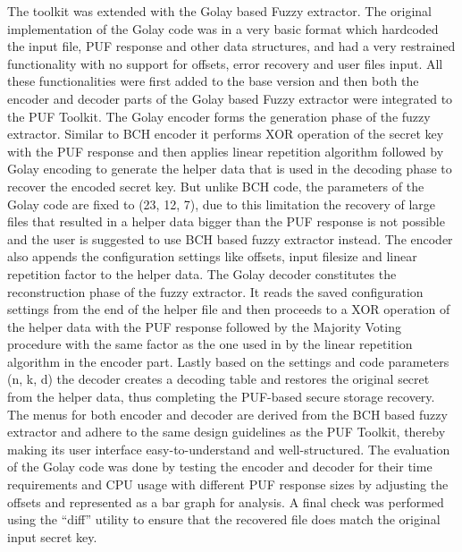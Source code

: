 The toolkit was extended with the Golay based Fuzzy extractor. The original implementation of the Golay code was in a very basic format which hardcoded the input file, PUF response and other data structures, and had a very restrained functionality with no support for offsets, error recovery and user files input. All these functionalities were first added to the base version and then both the encoder and decoder parts of the Golay based Fuzzy extractor were integrated to the PUF Toolkit. The
Golay encoder forms the generation phase of the fuzzy extractor. Similar to BCH encoder it performs XOR operation of the secret key with the PUF response and then applies linear repetition algorithm followed by Golay encoding to generate the helper data that is used in the decoding phase to recover the encoded secret key. But unlike BCH code, the parameters of the Golay code are fixed to (23, 12, 7), due to this limitation the recovery of large files that resulted in a helper data bigger than
the PUF response is not possible and the user is suggested to use BCH based fuzzy extractor instead. The encoder also appends the configuration settings like offsets, input filesize and linear repetition factor to the helper data. The Golay decoder constitutes the reconstruction phase of the fuzzy extractor. It reads the saved configuration settings from the end of the helper file and then proceeds to a XOR operation of the helper
data with the PUF response followed by the Majority Voting procedure with the same factor as the one used in by the linear repetition algorithm in the encoder part. Lastly based on the settings and code parameters (n, k, d) the decoder creates a decoding table and restores the original secret from the helper data, thus completing the PUF-based secure storage recovery. The menus for both encoder and decoder are derived from the BCH based fuzzy extractor and
adhere to the same design guidelines as the PUF Toolkit, thereby making its user interface easy-to-understand and well-structured. The evaluation of the Golay code was done by testing the encoder and decoder for their time requirements and CPU usage with different PUF response sizes by adjusting the offsets and represented as a bar graph for analysis. A final check was performed using the ``diff'' utility to ensure that the recovered file does match the original input secret key.

